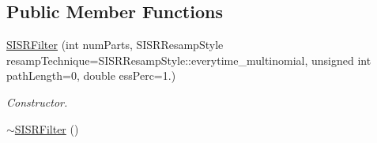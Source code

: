 \subsection*{Public Member Functions}
\begin{DoxyCompactItemize}
\item 
\hyperlink{classSISRFilter_a3105536db67f9aef8a08c32866a81a38}{S\+I\+S\+R\+Filter} (int num\+Parts, S\+I\+S\+R\+Resamp\+Style resamp\+Technique=S\+I\+S\+R\+Resamp\+Style\+::everytime\+\_\+multinomial, unsigned int path\+Length=0, double ess\+Perc=1.)
\begin{DoxyCompactList}\small\item\em Constructor. \end{DoxyCompactList}\item 
\hyperlink{classSISRFilter_a6953590c7317c8dbf2341640dea71af8}{$\sim$\+S\+I\+S\+R\+Filter} ()\hypertarget{classSISRFilter_a6953590c7317c8dbf2341640dea71af8}{}\label{classSISRFilter_a6953590c7317c8dbf2341640dea71af8}


\end{DoxyCompactItemize}
